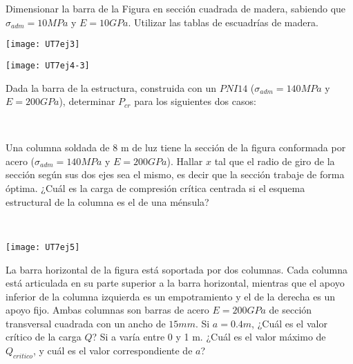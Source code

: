 \ejercicio 

Dimensionar la barra de la Figura en sección cuadrada de madera, sabiendo que $\sigma_{adm}=10MPa$ y $E=10GPa$. Utilizar las tablas de escuadrías de madera.

\begin{center}
\texttt{[image: UT7ej3]}
\end{center}

\ejercicio 

\begin{center}
\texttt{[image: UT7ej4-3]}
\end{center}

Dada la barra de la estructura, construida con un $PNI14$ ($\sigma_{adm}=140MPa$ y $E=200GPa$), determinar $P_{cr}$ para los siguientes dos casos:

\begin{figure}[htb]
	\centering
\subfloat[Caso 1]{
\texttt{[image: UT7ej4-1]}
	\label{fig:UT74.1}}
~
\subfloat[Caso 2]{
\texttt{[image: UT7ej4-2]}
	\label{fig:UT74.2}}
\caption{}
	\label{fig:UT74}
\end{figure}

\ejercicio

\begin{minipage}[b]{0.7\textwidth}

Una columna soldada de 8 m de luz tiene la sección de la figura conformada por acero ($\sigma_{adm}=140MPa$ y $E=200GPa$). 
\parte Hallar $x$ tal que el radio de giro de la sección según sus dos ejes sea el mismo, es decir que la sección trabaje de forma óptima.
\parte ¿Cuál es la carga de compresión crítica centrada si el esquema estructural de la columna es el de una ménsula?

\end{minipage}
~
\begin{minipage}[b]{0.3\textwidth}
\begin{center}
\texttt{[image: UT7ej5]}
\end{center}
\end{minipage}

\ejercicio

La barra horizontal de la figura está soportada por dos columnas. Cada columna está articulada en su parte superior a la barra horizontal, mientras que el apoyo inferior de la columna izquierda es un empotramiento y el de la derecha es un apoyo fijo. Ambas columnas son barras de acero $E=200GPa$ de sección transversal cuadrada con un ancho de $15 mm$.
\parte Si $a=0.4m$, ¿Cuál es el valor crítico de la carga $Q$?
\parte Si a varía entre 0 y 1 m. ¿Cuál es el valor máximo de $Q_{critico}$, y cuál es el valor correspondiente de $a$?

